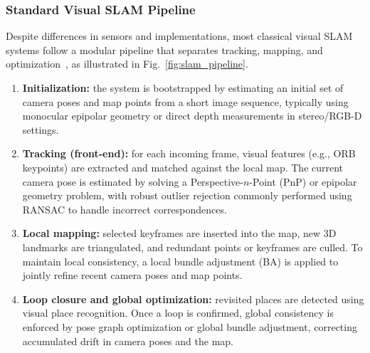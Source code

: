 \subsubsection*{Standard Visual SLAM Pipeline}
Despite differences in sensors and implementations, most classical visual SLAM systems follow a modular pipeline that separates tracking, mapping, and optimization~\cite{cadena2016slam,murartal2015orbslam,murartal2017orbslam2}, as illustrated in Fig.~\ref{fig:slam_pipeline}.

\begin{enumerate}
    \item \textbf{Initialization:} the system is bootstrapped by estimating an initial set of camera poses and map points from a short image sequence, typically using monocular epipolar geometry or direct depth measurements in stereo/RGB-D settings.

    \item \textbf{Tracking (front-end):} for each incoming frame, visual features (e.g., ORB keypoints) are extracted and matched against the local map. The current camera pose is estimated by solving a Perspective-$n$-Point (PnP) or epipolar geometry problem, with robust outlier rejection commonly performed using RANSAC to handle incorrect correspondences.

    \item \textbf{Local mapping:} selected keyframes are inserted into the map, new 3D landmarks are triangulated, and redundant points or keyframes are culled. To maintain local consistency, a local bundle adjustment (BA) is applied to jointly refine recent camera poses and map points.

    \item \textbf{Loop closure and global optimization:} revisited places are detected using visual place recognition. Once a loop is confirmed, global consistency is enforced by pose graph optimization or global bundle adjustment, correcting accumulated drift in camera poses and the map.
\end{enumerate}


